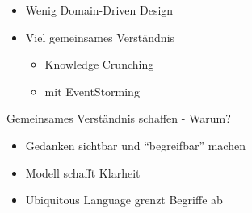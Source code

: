 
\begin{frame}[fragile]{}

\begin{itemize}
\item Wenig Domain-Driven Design
\item Viel gemeinsames Verständnis
\begin{itemize}
\item Knowledge Crunching
\item mit EventStorming
\end{itemize}

\end{itemize}

\end{frame}


\begin{frame}[fragile]{Gemeinsames Verständnis schaffen - Warum?}

\begin{itemize}
\item Gedanken sichtbar und ``begreifbar'' machen
\item Modell schafft Klarheit
\item Ubiquitous Language grenzt Begriffe ab
\end{itemize}

\end{frame}



\begin{frame}[fragile]{}


\end{frame}



